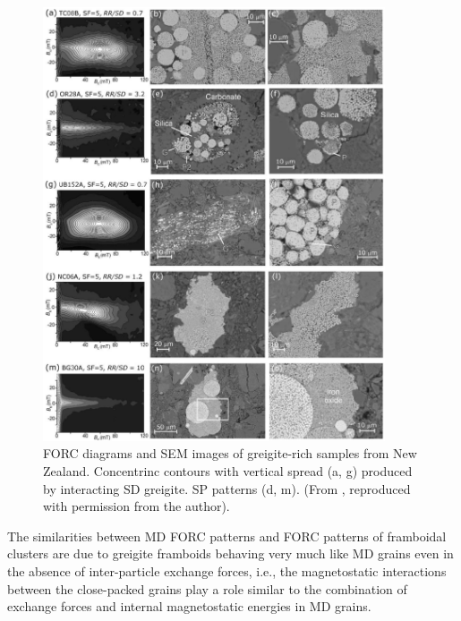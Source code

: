 \begin{figure}
\centering
\includegraphics[width=0.9\textwidth]{research-4/figs/Rowan2006.pdf}
\caption[FORC diagrams and SEM images of greigite-rich samples from New Zealand]{FORC diagrams and SEM images of greigite-rich samples from New Zealand. Concentrinc contours with vertical spread (a, g) produced by interacting SD greigite. SP patterns (d, m). (From \citet{Rowan2006}, reproduced with permission from the author).}
\label{FIG_F06_Rowan2006}
\end{figure}\par

The similarities between MD FORC patterns and FORC patterns of framboidal clusters are due to greigite framboids behaving very much like MD grains even in the absence of inter-particle exchange forces, i.e., the magnetostatic interactions between the close-packed grains play a role similar to the combination of exchange forces and internal magnetostatic energies in MD grains.\par

